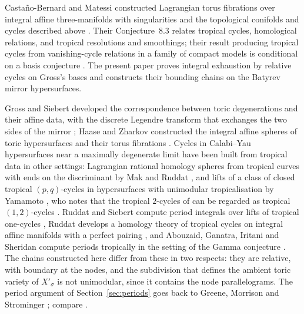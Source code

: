 Casta\~no-Bernard and Matessi constructed Lagrangian torus fibrations over integral affine three-manifolds with
singularities \cite{CBM09} and the topological conifolds and cycles described above \cite{CBM}. Their
Conjecture~8.3 relates tropical cycles, homological relations, and tropical resolutions and smoothings; their result
producing tropical cycles from vanishing-cycle relations in a family of compact models is conditional on a basis
conjecture \cite[Prop.~9.2]{CBM}. The present paper proves integral exhaustion by relative cycles on Gross's bases
and constructs their bounding chains on the Batyrev mirror hypersurfaces.

Gross and Siebert developed the correspondence between toric degenerations and their affine data, with the discrete
Legendre transform that exchanges the two sides of the mirror \cite{GSI}; Haase and Zharkov
constructed the integral affine spheres of toric hypersurfaces and their torus fibrations \cite{HZ1}. Cycles in
Calabi--Yau hypersurfaces near a maximally degenerate limit have been built from tropical data in other settings:
Lagrangian rational homology spheres from tropical curves with ends on the discriminant by Mak and Ruddat
\cite{MR20}, and lifts of a class of closed tropical $(p,q)$-cycles in hypersurfaces with unimodular tropicalisation by
Yamamoto \cite{Ya26}, who notes that the tropical $2$-cycles of \cite{CBM} can be regarded as tropical $(1,2)$-cycles
\cite[\S1, footnote]{Ya26}. Ruddat and Siebert compute period integrals over lifts of tropical one-cycles \cite{RS20},
Ruddat develops a homology theory of tropical cycles on integral affine manifolds with a perfect pairing \cite{Ru21},
and Abouzaid, Ganatra, Iritani and Sheridan compute periods tropically in the setting of the Gamma conjecture
\cite{AGIS20}. The chains constructed here differ from these in two respects: they are relative, with boundary at the
nodes, and the subdivision that defines the ambient toric variety of $X'_\sigma$ is not unimodular, since it contains the
node parallelograms. The period argument of Section~\ref{sec:periods} goes back to Greene, Morrison and Strominger
\cite{GMS95}; compare \cite{LLW18}.

